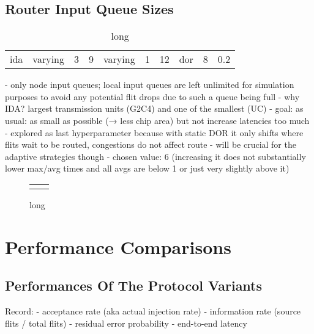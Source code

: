 \subsection{Router Input Queue Sizes}
\begin{table}
    \centering
    \begin{tabulary}{\textwidth}{C|C|C|C|C|C|C|C|C|C}
        \pProtVar{} & \pNCMode{} & \pEncMods{} & \pAuthMods{} & \pRQSize{} & \pARQLimit{} & \pARQTimeout{} & \pRStrat{} & \pNumAttackers{} & \pAttackProb{} \\\hline
        \gls{ida} & varying & 3 & 9 & varying & 1 & 12 & \gls{dor} & 8 & 0.2 \\
    \end{tabulary}
    \caption[Input parameters for router queue sizes experiment]{long}
    \label{tab:setupqueuesizes}
\end{table}
- only node input queues; local input queues are left unlimited for simulation purposes to avoid any potential flit drops due to such a queue being full
- why IDA? largest transmission units (G2C4) and one of the smallest (UC)
- goal: as usual: as small as possible (→ less chip area) but not increase latencies too much
- explored as last hyperparameter because with static DOR it only shifts where flits wait to be routed, congestions do not affect route
  - will be crucial for the adaptive strategies though
- chosen value: 6 (increasing it does not substantially lower max/avg times and all avgs are below 1 or just very slightly above it)

\begin{figure}
    \centering
    \begin{tabular}{ll}
         & 
    \end{tabular}
    \caption[Results for router queue lengths experiment]{long}
    \label{fig:resultsqueuelengths}
\end{figure}

\section{Performance Comparisons}\label{sec:perfcompeval}
\subsection{Performances Of The Protocol Variants}
Record:
- acceptance rate (aka actual injection rate)
- information rate (source flits / total flits)
- residual error probability
- end-to-end latency

